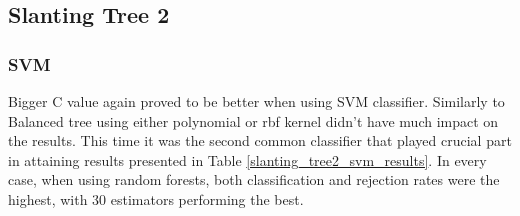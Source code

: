 \subsection{Slanting Tree 2}

\subsubsection{SVM}

Bigger C value again proved to be better when using SVM classifier. Similarly to Balanced tree using either polynomial or rbf kernel didn't have much impact on the results. This time it was the second common classifier that played crucial part in attaining results presented in Table \ref{slanting_tree2_svm_results}. In every case, when using random forests, both classification and rejection rates were the highest, with 30 estimators performing the best.

